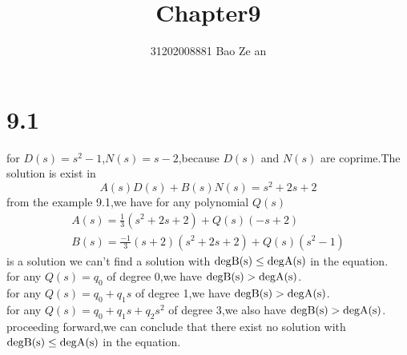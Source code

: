 \documentclass{article}
\title{Chapter9}
\author{31202008881        \quad \quad \quad
          Bao Ze an}
\begin{document}
\setlength{\parindent}{2em}
\maketitle

\section*{9.1}
for $D(s)=s^2-1$,$N(s)=s-2$,because $D(s)$ and $N(s)$ are coprime.The solution is exist in
\[A(s)D(s)+B(s)N(s)=s^2+2s+2\]
from the example 9.1,we have for any polynomial $Q(s)$
\[
\begin{split}
A(s)=\frac{1}{3}(s^2+2s+2)+Q(s)(-s+2)\\
B(s)=\frac{-1}{3}(s+2)(s^2+2s+2)+Q(s)(s^2-1)
\end{split}
\]
is a solution
we can't find a solution with $\rm{deg} B(s) \leq \rm{deg} A(s)$ in the equation.\\
for any $Q(s)=q_0$ of degree 0,we have $\rm{deg} B(s) >\rm{deg} A(s)$.\\
for any $Q(s)=q_0+q_1s$ of degree 1,we have $\rm{deg} B(s)>\rm{deg} A(s)$.\\for any
$Q(s)=q_0+q_1s+q_2s^2$ of degree 3,we also have $\rm{deg} B(s)>\rm{deg} A(s)$.\\
proceeding forward,we can 
conclude that there exist no solution with $\rm{deg} B(s) \leq \rm{deg} A(s)$ in the equation.
\end{document}
